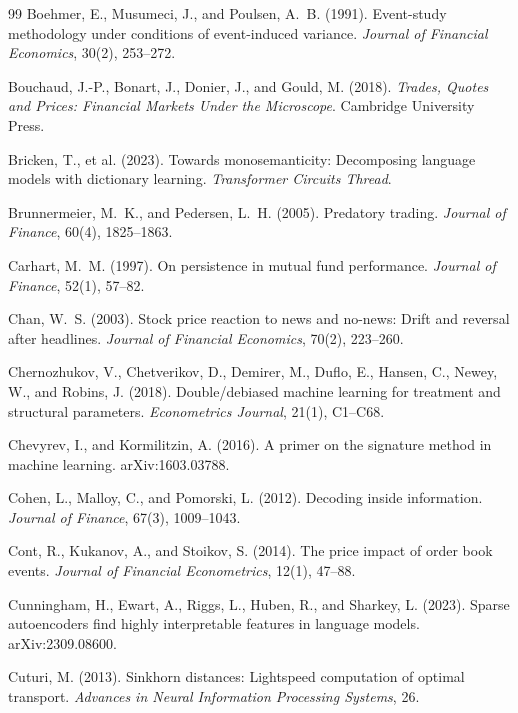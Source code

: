 \documentclass[11pt,a4paper]{article}
\theoremstyle{plain}
\theoremstyle{definition}
\theoremstyle{remark}
\begin{document}
\begin{thebibliography}{99}
Boehmer, E., Musumeci, J., and Poulsen, A.~B. (1991). Event-study methodology under conditions of event-induced variance. \emph{Journal of Financial Economics}, 30(2), 253--272.

Bouchaud, J.-P., Bonart, J., Donier, J., and Gould, M. (2018). \emph{Trades, Quotes and Prices: Financial Markets Under the Microscope}. Cambridge University Press.

Bricken, T., et al. (2023). Towards monosemanticity: Decomposing language models with dictionary learning. \emph{Transformer Circuits Thread}.

Brunnermeier, M.~K., and Pedersen, L.~H. (2005). Predatory trading. \emph{Journal of Finance}, 60(4), 1825--1863.

Carhart, M.~M. (1997). On persistence in mutual fund performance. \emph{Journal of Finance}, 52(1), 57--82.

Chan, W.~S. (2003). Stock price reaction to news and no-news: Drift and reversal after headlines. \emph{Journal of Financial Economics}, 70(2), 223--260.

Chernozhukov, V., Chetverikov, D., Demirer, M., Duflo, E., Hansen, C., Newey, W., and Robins, J. (2018). Double/debiased machine learning for treatment and structural parameters. \emph{Econometrics Journal}, 21(1), C1--C68.

Chevyrev, I., and Kormilitzin, A. (2016). A primer on the signature method in machine learning. arXiv:1603.03788.

Cohen, L., Malloy, C., and Pomorski, L. (2012). Decoding inside information. \emph{Journal of Finance}, 67(3), 1009--1043.

Cont, R., Kukanov, A., and Stoikov, S. (2014). The price impact of order book events. \emph{Journal of Financial Econometrics}, 12(1), 47--88.

Cunningham, H., Ewart, A., Riggs, L., Huben, R., and Sharkey, L. (2023). Sparse autoencoders find highly interpretable features in language models. arXiv:2309.08600.

Cuturi, M. (2013). Sinkhorn distances: Lightspeed computation of optimal transport. \emph{Advances in Neural Information Processing Systems}, 26.


\end{thebibliography}
\end{document}
